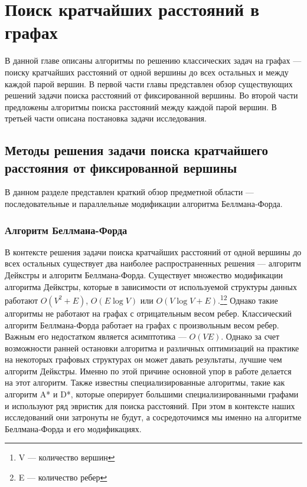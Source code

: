 \chapter{Поиск кратчайших расстояний в графах}
\label{chapSVD}

В данной главе описаны алгоритмы по решению классических задач на графах --- поиску кратчайших расстояний от одной вершины до всех остальных и между каждой парой вершин. В первой части главы представлен обзор существующих решений задачи поиска расстояний от фиксированной вершины. Во второй части предложены алгоритмы поиска расстояний между каждой парой вершин. В третьей части описана постановка задачи исследования.

\FloatBarrier
\section{Методы решения задачи поиска кратчайшего расстояния от фиксированной вершины}

В данном разделе представлен краткий обзор предметной области --- последовательные и параллельные модификации алгоритма Беллмана-Форда.

\FloatBarrier
\subsection{Алгоритм Беллмана-Форда}

В контексте решения задачи поиска кратчайших расстояний от одной вершины до всех остальных существует два наиболее распространенных решения --- алгоритм Дейкстры и алгоритм Беллмана-Форда. Существует множество модификации алгоритма Дейкстры, которые в зависимости от используемой структуры данных работают $O(V^2+E)$, $O(E \log V)$ или $O(V \log V+E)$.\footnote{V --- количество вершин}\footnote{E --- количество ребер} Однако такие алгоритмы не работают на графах с отрицательным весом ребер. Классический алгоритм Беллмана-Форда работает на графах с произвольным весом ребер. Важным его недостатком является асимптотика --- $O(VE)$. Однако за счет возможности ранней остановки алгоритма и различных оптимизаций на практике на некоторых графовых структурах он может давать результаты, лучшие чем алгоритм Дейкстры. Именно по этой причине основной упор в работе делается на этот алгоритм. Также известны специализированные алгоритмы, такие как алгоритм A* и D*, которые оперирует большими специализированными графами и используют ряд эвристик для поиска расстояний. При этом в контексте наших исследований они затронуты не будут, а сосредоточимся мы именно на алгоритме Беллмана-Форда и его модификациях.   

